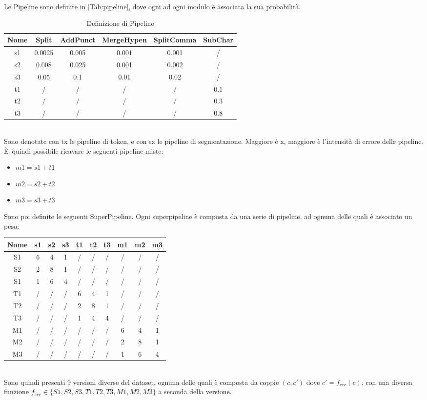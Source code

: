 \documentclass[12pt]{article}
\newcommand{\E}{È}
\begin{document}
Le Pipeline sono definite in \autoref{Tab:pipeline}, dove ogni ad ogni modulo è associata la sua probabilità.
\begin{table}[h!]
\centering
\begin{tabular}{cccccc}
\textbf{Nome} & \textbf{Split} & \textbf{AddPunct} & \textbf{MergeHypen} & \textbf{SplitComma} & \textbf{SubChar} \\
\hline
s1 	& 0.0025 	& 0.005 	& 0.001 	& 0.001 	& / 		\\	
s2 	& 0.008 		& 0.025 	& 0.001 	& 0.002 	& /		\\
s3 	& 0.05 		& 0.1 	& 0.01 	& 0.02 	& / 		\\ \hline
t1 	& /			& /		& /		& /		& 0.1	\\
t2 	& /			& /		& /		& /		& 0.3	\\
t3 	& /			& /		& /		& /		& 0.8	\\
\end{tabular}

\caption{Definizione di Pipeline}
\label{Tab:pipeline}
\end{table}
\\
Sono denotate con tx le pipeline di token, e con sx le pipeline di segmentazione. Maggiore è x, maggiore è l'intensità di errore delle pipeline.\\
\E\ quindi possibile ricavare le seguenti pipeline miste:
\begin{itemize}
\item $m1 = s1 + t1$
\item $m2 = s2 + t2$
\item $m3 = s3 + t3$
\end{itemize}


Sono poi definite le seguenti SuperPipeline. Ogni superpipeline è composta da una serie di pipeline, ad ognuna delle quali è associato un peso:
\begin{table}[h!]
\centering
\begin{tabular}{cccccccccc}
\textbf{Nome} & \textbf{s1} & \textbf{s2} & \textbf{s3} & \textbf{t1} & \textbf{t2} & \textbf{t3} & \textbf{m1} & \textbf{m2} & \textbf{m3}\\
\hline
S1	& 6	& 4	& 1	& /	& /	& / & / & / & / \\ 
S2	& 2	& 8	& 1	& /	& /	& / & / & / & / \\ 
S1	& 1	& 6	& 4	& /	& /	& / & / & / & / \\  \hline
T1	& /	& /	& /	& 6	& 4	& 1 & / & / & / \\ 
T2	& /	& /	& /	& 2	& 8	& 1 & / & / & / \\  
T3	& /	& /	& /	& 1	& 4	& 4 & / & / & / \\   \hline
M1	& /	& /	& /	& /	& /	& / & 6 & 4 & 1 \\ 
M2	& /	& /	& /	& /	& /	& / & 2 & 8 & 1 \\  
M3	& /	& /	& /	& /	& /	& / & 1 & 6 & 4 \\ 
\end{tabular}
\end{table}
\\
Sono quindi presenti 9 versioni diverse del dataset, ognuna delle quali è composta da coppie $(c,c\prime)$ dove  
$c' = f_{err}(c)$, con una diversa funzione $f_{err} \in \{ S1,S2,S3,T1,T2,T3,M1,M2,M3 \} $ a seconda della versione.
\end{document}
